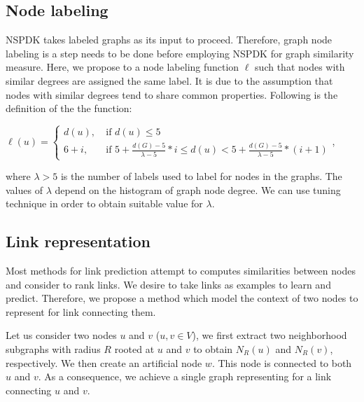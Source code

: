 \documentclass[runningheads,a4paper]{llncs}
\begin{document}
\subsection{Node labeling}
NSPDK takes labeled graphs as its input to proceed. Therefore, graph node labeling is a step needs to be done before employing NSPDK for graph similarity measure. Here, we propose to a node labeling function $\ell$ such that nodes with similar degrees are assigned the same label. It is due to the assumption that nodes with similar degrees tend to share common properties. Following is the definition of the the function:
\begin{center}
$\ell(u) = \left\{
	\begin{array}{ll}
		d(u),\  & \mbox{if } d(u) \leq 5 \\
		6+i,\ & \mbox{if }  5 + \frac{d(G) - 5}{\lambda-5}*i \leq d(u) < 5 + \frac{d(G) - 5}{\lambda-5}*(i+1)
	\end{array}
\right.$,
\end{center}
where $\lambda > 5$ is the number of labels used to label for nodes in the graphs. The values of $\lambda$ depend on the histogram of graph node degree. We can use tuning technique in order to obtain suitable value for $\lambda$.
\subsection{Link representation}
Most methods for link prediction attempt to computes similarities between nodes and consider to rank links. We desire to take links as examples to learn and predict. Therefore, we propose a method which model the context of two nodes to represent for link connecting them.

Let us consider two nodes $u$ and $v$ ($u, v \in V$), we first extract two neighborhood subgraphs with radius $R$ rooted at $u$ and $v$ to obtain $N_R(u)$ and $N_R(v)$, respectively. We then create an artificial node $w$. This node is connected to both $u$ and $v$. As a consequence, we achieve a single graph representing for a link connecting $u$ and $v$.
\end{document}
